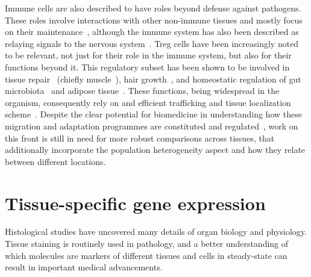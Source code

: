 Immune cells are also described to have roles beyond defense against pathogens. These roles involve interactions with other non-immune tissues and mostly focus on their maintenance~\citep{gordon_physiological_2017,laurent_immune-mediated_2017}, although the immune system has also been described as relaying signals to the nervous system~\citep{veiga-fernandes_neuro-immune_2016}. Treg cells have been increasingly noted to be relevant, not just for their role in the immune system, but also for their functions beyond it. This regulatory subset has been shown to be involved in tissue repair~\citep{li_regulatory_2018} (chiefly muscle~\citep{burzyn_special_2013}), hair growth~\citep{ali_regulatory_2017}, and homeostatic regulation of gut microbiota~\citep{cebula_thymus-derived_2013} and adipose tissue~\citep{cipolletta_adipose_2014,sharma_emerging_2018}. These functions, being widespread in the organism, consequently rely on and efficient trafficking and tissue localization scheme~\citep{liston_homeostatic_2014}. Despite the clear potential for biomedicine in understanding how these migration and adaptation programmes are constituted and regulated~\citep{agace_tissue-tropic_2006}, work on this front is still in need for more robust comparisons across tissues, that additionally incorporate the population heterogeneity aspect and how they relate between different locations.



\section{Tissue-specific gene expression}  %
\label{section1.5}

Histological studies have uncovered many details of organ biology and physiology. Tissue staining is routinely used in pathology, and a better understanding of which molecules are markers of different tissues and cells in steady-state can result in important medical advancements.

